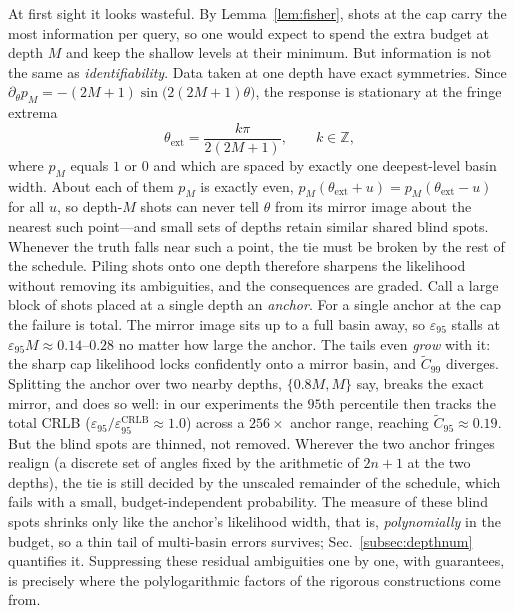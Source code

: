 \documentclass[%
 twocolumn,
 amsmath,amssymb,
prx,
longbibliography
]{revtex4-2}
\begin{document}
At first sight it looks wasteful. By Lemma~\ref{lem:fisher}, shots at the cap carry the most information per query, so one would expect to spend the extra budget at depth $M$ and keep the shallow levels at their minimum. But information is not the same as \emph{identifiability}. Data taken at one depth have exact symmetries. Since $\partial_\theta p_M = -(2M{+}1)\sin\big(2(2M{+}1)\theta\big)$, the response is stationary at the fringe extrema
\begin{equation}\label{eq:extrema}
    \theta_{\mathrm{ext}} = \frac{k\pi}{2(2M+1)}, \qquad k \in \mathbb{Z},
\end{equation}
where $p_M$ equals $1$ or $0$ and which are spaced by exactly one deepest-level basin width. About each of them $p_M$ is exactly even, $p_M(\theta_{\mathrm{ext}} + u) = p_M(\theta_{\mathrm{ext}} - u)$ for all $u$, so depth-$M$ shots can never tell $\theta$ from its mirror image about the nearest such point---and small sets of depths retain similar shared blind spots. Whenever the truth falls near such a point, the tie must be broken by the rest of the schedule. Piling shots onto one depth therefore sharpens the likelihood without removing its ambiguities, and the consequences are graded. Call a large block of shots placed at a single depth an \emph{anchor}. For a single anchor at the cap the failure is total. The mirror image sits up to a full basin away, so $\varepsilon_{95}$ stalls at $\varepsilon_{95} M \approx 0.14$--$0.28$ no matter how large the anchor. The tails even \emph{grow} with it: the sharp cap likelihood locks confidently onto a mirror basin, and $\widetilde C_{99}$ diverges. Splitting the anchor over two nearby depths, $\{0.8M, M\}$ say, breaks the exact mirror, and does so well: in our experiments the $95$th percentile then tracks the total \ac{CRLB} ($\varepsilon_{95}/\varepsilon_{95}^{\mathrm{CRLB}} \approx 1.0$) across a $256\times$ anchor range, reaching $\widetilde C_{95} \approx 0.19$. But the blind spots are thinned, not removed. Wherever the two anchor fringes realign (a discrete set of angles fixed by the arithmetic of $2n+1$ at the two depths), the tie is still decided by the unscaled remainder of the schedule, which fails with a small, budget-independent probability. The measure of these blind spots shrinks only like the anchor's likelihood width, that is, \emph{polynomially} in the budget, so a thin tail of multi-basin errors survives; Sec.~\ref{subsec:depthnum} quantifies it. Suppressing these residual ambiguities one by one, with guarantees, is precisely where the polylogarithmic factors of the rigorous constructions come from.
\end{document}
